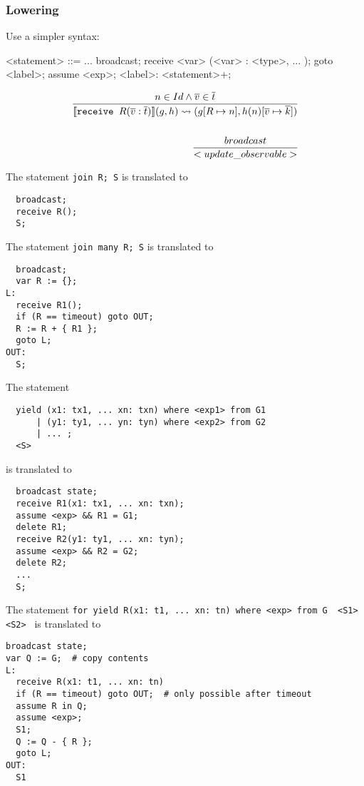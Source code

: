 \documentclass[acmsmall,review,anonymous]{acmart}\settopmatter{printfolios=true,printccs=false,printacmref=false}
\begin{document}
\vfill
\pagebreak

\subsubsection{Lowering}
Use a simpler syntax:

\begin{grammar}

  <statement> ::= ...
                  \alt broadcast;
                  \alt receive <var> (<var> : <type>, ... );
                  \alt goto <label>;
                  \alt assume <exp>;
                  \alt <label>: <statement>+;

\end{grammar}

\begin{align*}
  n\in Id \wedge \overline{v} \in \overline{t} \over{
  \llbracket \texttt{receive }R(\overline{v}: \overline{t}) \rrbracket (g, h) \rightsquigarrow (g[R \mapsto n], h(n)[\overline{v} \mapsto \overline{k}]) }\\
  \\
  broadcast \over{
  <update\_observable> } \\
\end{align*}


The statement \texttt{join R; S} is translated to
\begin{lstlisting}
  broadcast;
  receive R();
  S;
\end{lstlisting}

The statement \texttt{join many R; S} is translated to
\begin{lstlisting}
  broadcast;
  var R := {};
L:
  receive R1();
  if (R == timeout) goto OUT;
  R := R + { R1 };
  goto L;
OUT:
  S;
\end{lstlisting}

The statement
\begin{lstlisting}
  yield (x1: tx1, ... xn: txn) where <exp1> from G1
      | (y1: ty1, ... yn: tyn) where <exp2> from G2
      | ... ;
  <S>
\end{lstlisting}

is translated to
\begin{lstlisting}
  broadcast state;
  receive R1(x1: tx1, ... xn: txn);
  assume <exp> && R1 = G1;
  delete R1;
  receive R2(y1: ty1, ... xn: tyn);
  assume <exp> && R2 = G2;
  delete R2;
  ...
  S;
\end{lstlisting}

The statement \texttt{for yield R(x1: t1, ... xn: tn) where <exp> from G { <S1> } <S2> } is translated to
\begin{lstlisting}
broadcast state;
var Q := G;  # copy contents
L:
  receive R(x1: t1, ... xn: tn)
  if (R == timeout) goto OUT;  # only possible after timeout
  assume R in Q;
  assume <exp>;
  S1;
  Q := Q - { R };
  goto L;
OUT:
  S1
\end{lstlisting}
\end{document}
